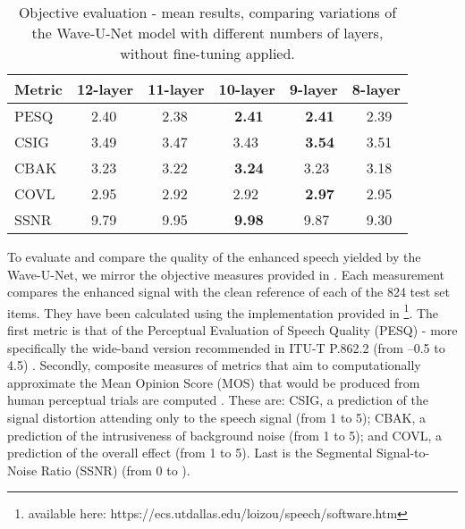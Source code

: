 \documentclass{article}
\begin{document}
\begin{table}
  \caption{Objective evaluation - mean results, comparing variations of the Wave-U-Net model with different numbers of layers, without fine-tuning applied.}
\label{sample-table}
  \centering
  \begin{tabular}{llllll}
    \toprule
\textbf{Metric}     &\textbf{12-layer}     &\textbf{11-layer}     &\textbf{10-layer}     &\textbf{9-layer}     &\textbf{8-layer} \\
    \midrule


    PESQ & \, \, 2.40 & \, \, 2.38 & \textbf{\, \, 2.41} & \textbf{\, \, 2.41} & \, \, 2.39    \\
    CSIG & \, \, 3.49 & \, \, 3.47 & \, \, 3.43 & \textbf{\, \, 3.54} & \, \, 3.51      \\
    CBAK & \, \, 3.23 & \, \, 3.22 & \textbf{\, \, 3.24} & \, \, 3.23 & \, \, 3.18      \\
    COVL & \, \, 2.95 & \, \, 2.92 & \, \, 2.92 & \textbf{\, \, 2.97} & \, \, 2.95    \\
    SSNR & \, \, 9.79 & \, \, 9.95 & \textbf{\, \, 9.98} & \, \, 9.87 & \, \, 9.30     \\
    
\bottomrule
  \end{tabular}
\end{table}

To evaluate and compare the quality of the enhanced speech yielded by the Wave-U-Net, we mirror the objective measures provided in \citep{Pascual2017}. 
Each measurement compares the enhanced signal with the clean reference of each of the 824 test set items. 
They have been calculated using the implementation provided in \citep{Loizou:2013:SET:2484638}\footnote{available here: https://ecs.utdallas.edu/loizou/speech/software.htm}. The first metric is that of the Perceptual Evaluation of Speech Quality (PESQ) - more specifically the wide-band version recommended in ITU-T P.862.2 (from –0.5 to 4.5) \citep{Loizou:2013:SET:2484638, Pascual2017}. Secondly, composite measures of metrics that aim to computationally approximate the Mean Opinion Score (MOS) that would be produced from human perceptual trials are computed \citep{RethageADenoising}. These are: CSIG, a prediction of the signal
distortion attending only to the speech signal \citep{Hu2008EvaluationEnhancement} (from 1 to 5); CBAK, a prediction of the intrusiveness of background noise \citep{Hu2008EvaluationEnhancement} (from 1 to 5); and COVL, a prediction of the overall effect \citep{Hu2008EvaluationEnhancement} (from 1
to 5). Last is the Segmental Signal-to-Noise Ratio (SSNR) \citep{Quackenbush1988ObjectiveQuality} (from 0 to ).
\end{document}
